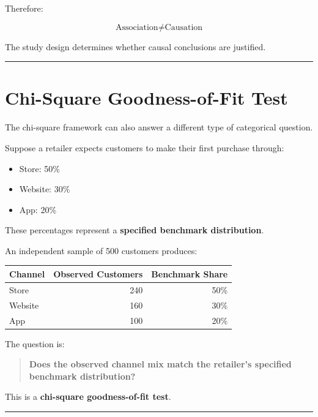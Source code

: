 \documentclass[
  letterpaper,
  DIV=11,
  numbers=noendperiod]{scrreprt}
\newcounter{none} %
\providecommand{\tightlist}{%
  \setlength{\itemsep}{0pt}\setlength{\parskip}{0pt}}
\begin{document}
Therefore:

\[
\boxed{
\text{Association}
\neq
\text{Causation}
}
\]

The study design determines whether causal conclusions are justified.

\begin{center}\rule{0.5\linewidth}{0.5pt}\end{center}


\chapter{Chi-Square Goodness-of-Fit
Test}\label{chi-square-goodness-of-fit-test}

The chi-square framework can also answer a different type of categorical
question.

Suppose a retailer expects customers to make their first purchase
through:

\begin{itemize}
\tightlist
\item
  Store: 50\%
\item
  Website: 30\%
\item
  App: 20\%
\end{itemize}

These percentages represent a \textbf{specified benchmark distribution}.

An independent sample of 500 customers produces:

{\def\LTcaptype{none} %
\begin{longtable}[]{@{}lrr@{}}
\toprule\noalign{}
Channel & Observed Customers & Benchmark Share \\
\midrule\noalign{}
\endhead
\bottomrule\noalign{}
\endlastfoot
Store & 240 & 50\% \\
Website & 160 & 30\% \\
App & 100 & 20\% \\
\end{longtable}
}

The question is:

\begin{quote}
\textbf{Does the observed channel mix match the retailer's specified
benchmark distribution?}
\end{quote}

This is a \textbf{chi-square goodness-of-fit test}.

\begin{center}\rule{0.5\linewidth}{0.5pt}\end{center}
\end{document}

